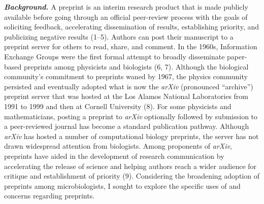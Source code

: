 \documentclass[11pt,]{article}
\begin{document}
\textbf{\emph{Background.}} A preprint is an interim research product
that is made publicly available before going through an official
peer-review process with the goals of soliciting feedback, accelerating
dissemination of results, establishing priority, and publicizing
negative results (1--5). Authors can post their manuscript to a preprint
server for others to read, share, and comment. In the 1960s, Information
Exchange Groups were the first formal attempt to broadly disseminate
paper-based preprints among physicists and biologists (6, 7). Although
the biological community's commitment to preprints waned by 1967, the
physics community persisted and eventually adopted what is now the
\emph{arXiv} (pronounced ``archive'') preprint server that was hosted at
the Los Alamos National Laboratories from 1991 to 1999 and then at
Cornell University (8). For some physicists and mathematicians, posting
a preprint to \emph{arXiv} optionally followed by submission to a
peer-reviewed journal has become a standard publication pathway.
Although \emph{arXiv} has hosted a number of computational biology
preprints, the server has not drawn widespread attention from
biologists. Among proponents of \emph{arXiv}, preprints have aided in
the development of research communication by accelerating the release of
science and helping authors reach a wider audience for critique and
establishment of priority (9). Considering the broadening adoption of
preprints among microbiologists, I sought to explore the specific uses
of and concerns regarding preprints.
\end{document}
